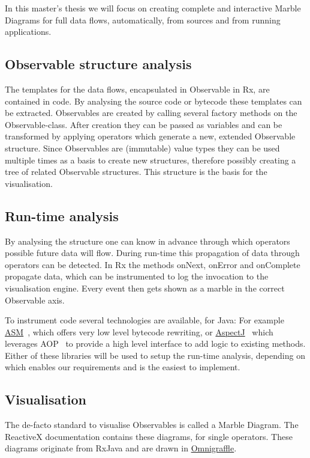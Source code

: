 \documentclass[11pt,a4paper]{article}
\begin{document}
In this master's thesis we will focus on creating complete and
interactive Marble Diagrams for full data flows, automatically, from
sources and from running applications.

\subsection{Observable structure analysis} The templates for the data
flows, encapsulated in Observable in Rx, are contained in code.  By
analysing the source code or bytecode these templates can be extracted.
Observables are created by calling several factory methods on the
Observable-class.  After creation they can be passed as variables and
can be transformed by applying operators which generate a new, extended
Observable structure.  Since Observables are (immutable) value types
they can be used multiple times as a basis to create new structures,
therefore possibly creating a tree of related Observable structures.
This structure is the basis for the visualisation.

\subsection{Run-time analysis} By analysing the structure one can know
in advance through which operators possible future data will flow.
During run-time this propagation of data through operators can be
detected.  In Rx the methods onNext, onError and onComplete propagate
data, which can be instrumented to log the invocation to the
visualisation engine.  Every event then gets shown as a marble in the
correct Observable axis.

To instrument code several technologies are available, for Java:  For
example \href{http://asm.ow2.org}{ASM}~\cite{bruneton2002asm,
kuleshov2007using}, which offers very low level bytecode rewriting, or
\href{http://www.eclipse.org/aspectj/}{AspectJ}~\cite{kiczales2001overview}
which leverages AOP~\cite{kiczales1997aspect} to provide a high level
interface to add logic to existing methods.  Either of these libraries
will be used to setup the run-time analysis, depending on which enables
our requirements and is the easiest to implement.

\subsection{Visualisation} The de-facto standard to visualise
Observables is called a Marble Diagram.  The ReactiveX documentation
contains these diagrams, for single operators.  These diagrams originate
from RxJava and are drawn in \href{https://www.omnigroup.com/omnigraffle}
{Omnigraffle}.
\end{document}
